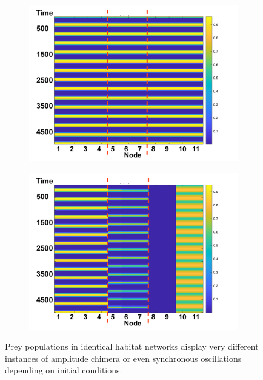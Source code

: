 \documentclass[12pt]{article}
\begin{document}
\begin{figure}[H]
\begin{subfigure}[b]{0.5\linewidth}
     \end{subfigure}
     \begin{subfigure}[b]{0.5\linewidth}
     \centering
     \includegraphics[width=\textwidth]{Claire Section/behavior_3.png}
     \end{subfigure}
     \begin{subfigure}[b]{0.5\linewidth}
     \centering
     \includegraphics[width=\textwidth]{Claire Section/behavior_4.png}
     \end{subfigure}
     \label{fig: sensitivity to ics}
     \caption{Prey populations in identical habitat networks display very different instances of amplitude chimera or even synchronous oscillations depending on initial conditions.}
\end{figure}
\end{document}
